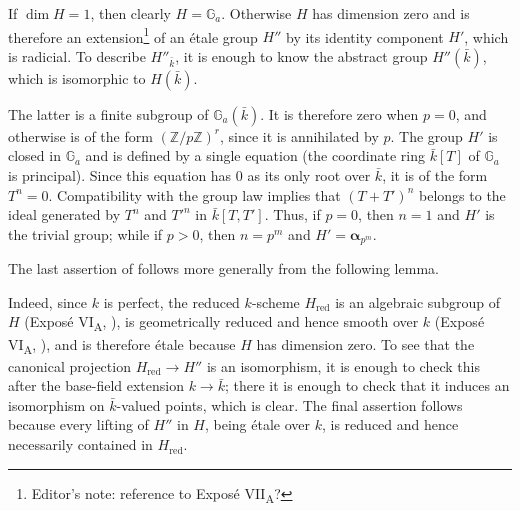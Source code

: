 

If \(\dim H=1\), then clearly \(H=\mathbb G_a\).  Otherwise \(H\) has
dimension zero and is therefore an extension\footnote{Editor's note:
reference to Exposé VII\textsubscript{A}?} of an étale group \(H''\) by its
identity component \(H'\), which is radicial.  To describe \(H''_{\bar{k}}\),
it is enough to know the abstract group \(H''(\bar{k})\), which is isomorphic
to \(H(\bar{k})\).

The latter is a finite subgroup of \(\mathbb G_a(\bar{k})\).  It is therefore
zero when \(p=0\), and otherwise is of the form
\((\mathbb Z/p\mathbb Z)^r\), since it is annihilated by \(p\).  The group
\(H'\) is closed in \(\mathbb G_a\) and is defined by a single equation
(the coordinate ring \(\bar{k}[T]\) of \(\mathbb G_a\) is principal).
Since this equation has \(0\) as its only root over \(\bar{k}\), it is of the
form \(T^n=0\).  Compatibility with the group law implies that
\((T+T')^n\) belongs to the ideal generated by \(T^n\) and \(T'^n\) in
\(\bar{k}[T,T']\).  Thus, if \(p=0\), then \(n=1\) and \(H'\) is the trivial
group; while if \(p>0\), then \(n=p^m\) and
\(H'=\boldsymbol\alpha_{p^m}\).

The last assertion of  follows more generally from the
following lemma.


Indeed, since \(k\) is perfect, the reduced \(k\)-scheme
\(H_{\mathrm{red}}\) is an algebraic subgroup of \(H\)
(Exposé VI\textsubscript{A}, ), is geometrically reduced and hence smooth
over \(k\) (Exposé VI\textsubscript{A}, ), and is therefore étale because
\(H\) has dimension zero.  To see that the canonical projection
\(H_{\mathrm{red}}\to H''\) is an isomorphism, it is enough to check this after
the base-field extension \(k\to\bar{k}\); there it is enough to check that it
induces an isomorphism on \(\bar{k}\)-valued points, which is clear.  The final
assertion follows because every lifting of \(H''\) in \(H\), being étale over
\(k\), is reduced and hence necessarily contained in \(H_{\mathrm{red}}\).

